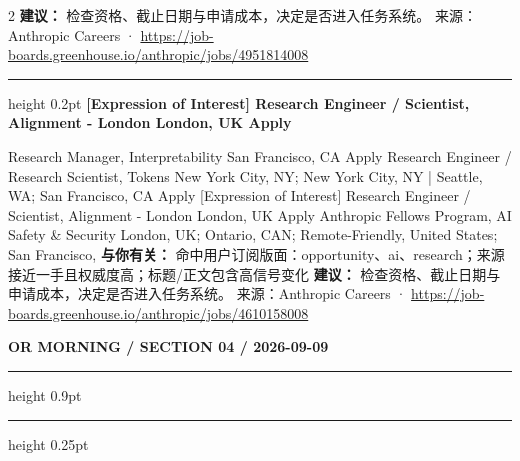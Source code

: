 \documentclass[10.5pt]{ctexart}
\begin{document}
\begin{multicols}{2}
\textbf{建议：} 检查资格、截止日期与申请成本，决定是否进入任务系统。
{\footnotesize\color{ormuted} 来源：Anthropic Careers · \url{https://job-boards.greenhouse.io/anthropic/jobs/4951814008}}
\vspace{2mm}
\hrule height 0.2pt
\vspace{2mm}
{\large\bfseries [Expression of Interest] Research Engineer / Scientist, Alignment - London London, UK Apply}\par
[Expression of Interest] Research Manager, Interpretability San Francisco, CA Apply Research Engineer / Research Scientist, Tokens New York City, NY; New York City, NY | Seattle, WA; San Francisco, CA Apply [Expression of Interest] Research Engineer / Scientist, Alignment - London London, UK Apply Anthropic Fellows Program, AI Safety \& Security London, UK; Ontario, CAN; Remote-Friendly, United States; San Francisco, 
\textbf{与你有关：} 命中用户订阅版面：opportunity、ai、research；来源接近一手且权威度高；标题/正文包含高信号变化
\textbf{建议：} 检查资格、截止日期与申请成本，决定是否进入任务系统。
{\footnotesize\color{ormuted} 来源：Anthropic Careers · \url{https://job-boards.greenhouse.io/anthropic/jobs/4610158008}}
\end{multicols}
\newpage
{\small\bfseries OR MORNING / SECTION 04 / 2026-09-09}
\vspace{2mm}
\hrule height 0.9pt
\vspace{1.5mm}
\hrule height 0.25pt
\vspace{4mm}
\end{document}
